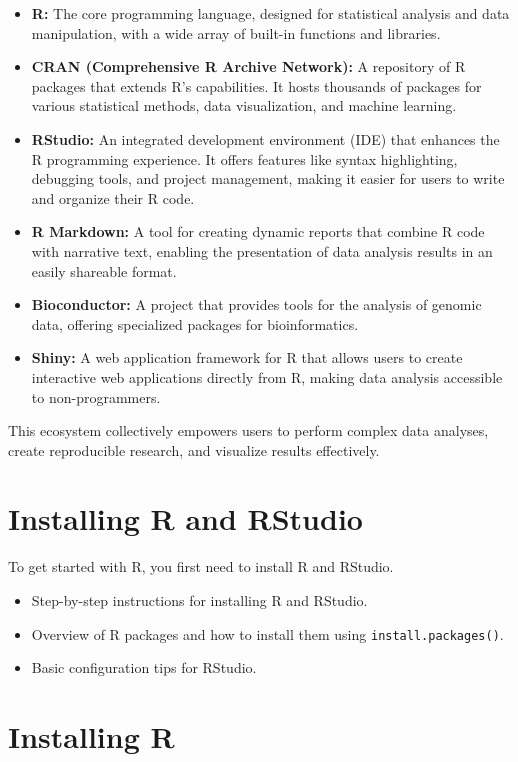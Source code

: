 \documentclass[12pt]{book}
\begin{document}
\begin{itemize}
\begin{itemize}
    \item \textbf{R:} The core programming language, designed for statistical analysis and data manipulation, with a wide array of built-in functions and libraries.
    \item \textbf{CRAN (Comprehensive R Archive Network):} A repository of R packages that extends R’s capabilities. It hosts thousands of packages for various statistical methods, data visualization, and machine learning.
    \item \textbf{RStudio:} An integrated development environment (IDE) that enhances the R programming experience. It offers features like syntax highlighting, debugging tools, and project management, making it easier for users to write and organize their R code.
    \item \textbf{R Markdown:} A tool for creating dynamic reports that combine R code with narrative text, enabling the presentation of data analysis results in an easily shareable format.
    \item \textbf{Bioconductor:} A project that provides tools for the analysis of genomic data, offering specialized packages for bioinformatics.
    \item \textbf{Shiny:} A web application framework for R that allows users to create interactive web applications directly from R, making data analysis accessible to non-programmers.
\end{itemize}

This ecosystem collectively empowers users to perform complex data analyses, create reproducible research, and visualize results effectively.


\end{itemize}

\section{Installing R and RStudio}
To get started with R, you first need to install R and RStudio.
\begin{itemize}
    \item Step-by-step instructions for installing R and RStudio.
    \item Overview of R packages and how to install them using \texttt{install.packages()}.
    \item Basic configuration tips for RStudio.
\end{itemize}

\section{Installing R}
\end{document}
